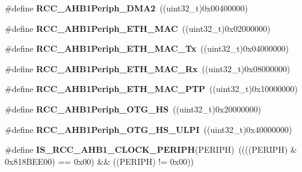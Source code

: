 \begin{DoxyCompactItemize}
\item 
\mbox{\label{group___r_c_c___a_h_b1___peripherals_ga18b2ad600629e2b0a87553167c63d417}} 
\#define {\bfseries R\+C\+C\+\_\+\+A\+H\+B1\+Periph\+\_\+\+D\+M\+A2}~((uint32\+\_\+t)0x00400000)
\item 
\mbox{\label{group___r_c_c___a_h_b1___peripherals_gafe79098122ff46546939086ccf6f4658}} 
\#define {\bfseries R\+C\+C\+\_\+\+A\+H\+B1\+Periph\+\_\+\+E\+T\+H\+\_\+\+M\+AC}~((uint32\+\_\+t)0x02000000)
\item 
\mbox{\label{group___r_c_c___a_h_b1___peripherals_gabd21e7036567b9fc67c631fb9487ef3e}} 
\#define {\bfseries R\+C\+C\+\_\+\+A\+H\+B1\+Periph\+\_\+\+E\+T\+H\+\_\+\+M\+A\+C\+\_\+\+Tx}~((uint32\+\_\+t)0x04000000)
\item 
\mbox{\label{group___r_c_c___a_h_b1___peripherals_gacabda9afb562d0cd0888af9dd455dc88}} 
\#define {\bfseries R\+C\+C\+\_\+\+A\+H\+B1\+Periph\+\_\+\+E\+T\+H\+\_\+\+M\+A\+C\+\_\+\+Rx}~((uint32\+\_\+t)0x08000000)
\item 
\mbox{\label{group___r_c_c___a_h_b1___peripherals_ga8a9a214e3a1ff169359ba066a46a2ce8}} 
\#define {\bfseries R\+C\+C\+\_\+\+A\+H\+B1\+Periph\+\_\+\+E\+T\+H\+\_\+\+M\+A\+C\+\_\+\+P\+TP}~((uint32\+\_\+t)0x10000000)
\item 
\mbox{\label{group___r_c_c___a_h_b1___peripherals_ga4280a7954d21649a4496fe85d734e861}} 
\#define {\bfseries R\+C\+C\+\_\+\+A\+H\+B1\+Periph\+\_\+\+O\+T\+G\+\_\+\+HS}~((uint32\+\_\+t)0x20000000)
\item 
\mbox{\label{group___r_c_c___a_h_b1___peripherals_gae23c1fbf41d63d4a122d726cc7051107}} 
\#define {\bfseries R\+C\+C\+\_\+\+A\+H\+B1\+Periph\+\_\+\+O\+T\+G\+\_\+\+H\+S\+\_\+\+U\+L\+PI}~((uint32\+\_\+t)0x40000000)
\item 
\mbox{\label{group___r_c_c___a_h_b1___peripherals_ga647f5c8de61a77084d4d0e6bdd344601}} 
\#define {\bfseries I\+S\+\_\+\+R\+C\+C\+\_\+\+A\+H\+B1\+\_\+\+C\+L\+O\+C\+K\+\_\+\+P\+E\+R\+I\+PH}(P\+E\+R\+I\+PH)~((((P\+E\+R\+I\+PH) \& 0x818\+B\+E\+E00) == 0x00) \&\& ((\+P\+E\+R\+I\+P\+H) != 0x00))

\end{DoxyCompactItemize}
